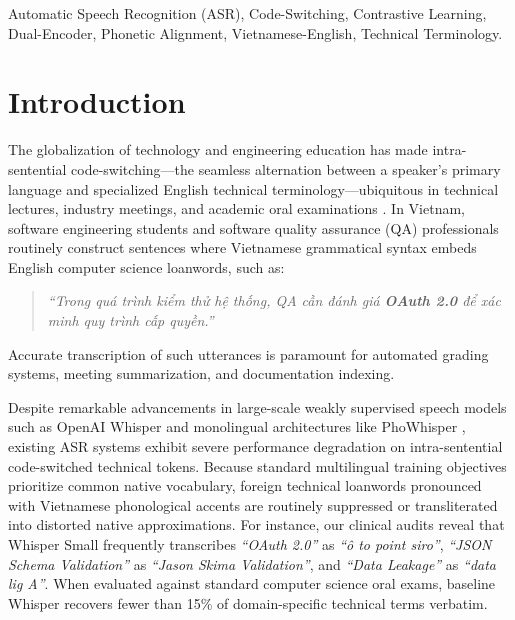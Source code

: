 \documentclass[11pt,conference,onecolumn]{IEEEtran}
\begin{document}
\begin{IEEEkeywords}
Automatic Speech Recognition (ASR), Code-Switching, Contrastive Learning, Dual-Encoder, Phonetic Alignment, Vietnamese-English, Technical Terminology.
\end{IEEEkeywords}

\section{Introduction}

The globalization of technology and engineering education has made intra-sentential code-switching---the seamless alternation between a speaker's primary language and specialized English technical terminology---ubiquitous in technical lectures, industry meetings, and academic oral examinations \cite{istqb2023ctfl}. In Vietnam, software engineering students and software quality assurance (QA) professionals routinely construct sentences where Vietnamese grammatical syntax embeds English computer science loanwords, such as:
\begin{quote}
\textit{``Trong quá trình kiểm thử hệ thống, QA cần đánh giá \textbf{OAuth 2.0} để xác minh quy trình cấp quyền.''}
\end{quote}
Accurate transcription of such utterances is paramount for automated grading systems, meeting summarization, and documentation indexing. 

Despite remarkable advancements in large-scale weakly supervised speech models such as OpenAI Whisper \cite{radford2023robust} and monolingual architectures like PhoWhisper \cite{phan2023phowhisper}, existing ASR systems exhibit severe performance degradation on intra-sentential code-switched technical tokens. Because standard multilingual training objectives prioritize common native vocabulary, foreign technical loanwords pronounced with Vietnamese phonological accents are routinely suppressed or transliterated into distorted native approximations. For instance, our clinical audits reveal that Whisper Small frequently transcribes \textit{``OAuth 2.0''} as \textit{``ô to point siro''}, \textit{``JSON Schema Validation''} as \textit{``Jason Skima Validation''}, and \textit{``Data Leakage''} as \textit{``data lig A''}. When evaluated against standard computer science oral exams, baseline Whisper recovers fewer than 15\% of domain-specific technical terms verbatim.
\end{document}
